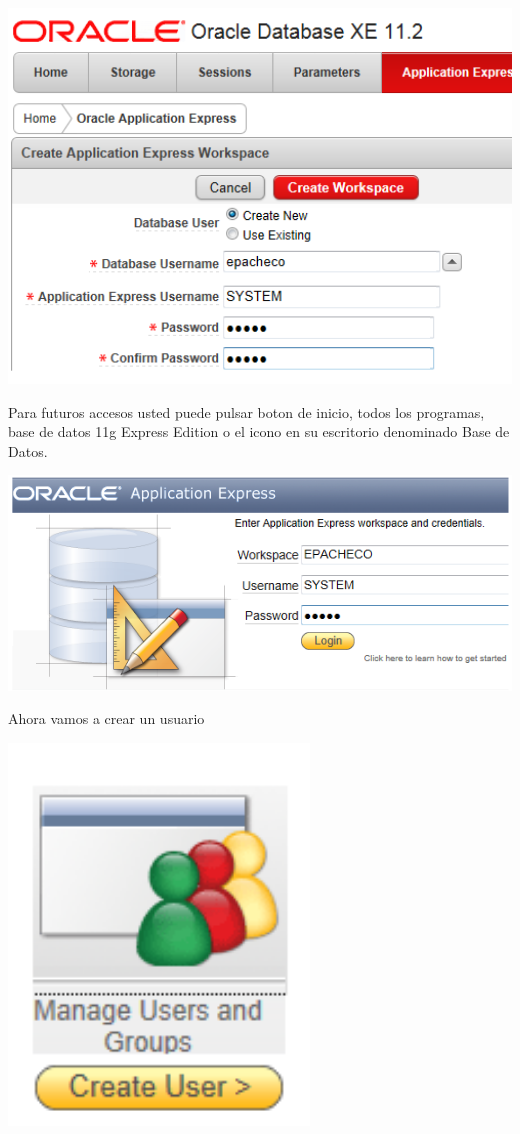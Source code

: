 \documentclass[12pt,letterpaper]{article}
\begin{document}
\begin{center}
\includegraphics[width=15cm]{./IMG/img31}
\end{center}
Para futuros accesos usted puede pulsar boton de inicio, todos los programas, base de datos 11g Express Edition o el icono en su escritorio denominado Base de Datos.
\begin{center}
\includegraphics[width=15cm]{./IMG/img32}
\end{center}
Ahora vamos a crear un usuario
\begin{center}
\includegraphics[width=8cm]{./IMG/img33}
\end{center}
\end{document}
